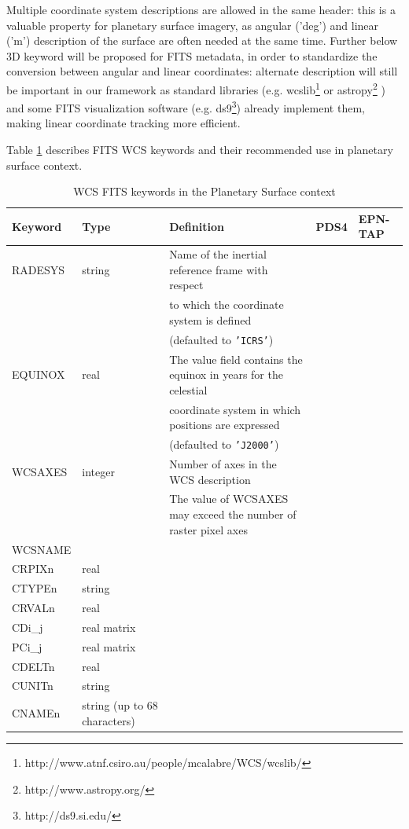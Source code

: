Multiple coordinate system descriptions are allowed in the same header: this is a valuable
property for planetary surface imagery, as angular ('deg') and linear ('m') description of
the surface are often needed at the same time.
Further below 3D keyword will be proposed for FITS metadata, in order to standardize
the conversion between angular and linear coordinates: alternate description will still
be important in our framework as standard libraries (e.g.
wcslib\footnote{http://www.atnf.csiro.au/people/mcalabre/WCS/wcslib/} or
astropy\footnote{http://www.astropy.org/} \citet{astropy}) and some FITS visualization
software (e.g. ds9\footnote{http://ds9.si.edu/}) already implement them, making linear
coordinate tracking more efficient.  

Table \ref{table:wcskeys} describes FITS WCS keywords and their recommended use in
planetary surface context.

\begin{table}
\label{table:wcskeys}
\caption{WCS FITS keywords in the Planetary Surface context}
\centering
\begin{tabular}{l l l l l}
\hline
Keyword & Type & Definition & PDS4 & EPN-TAP \\
\hline
RADESYS	& string & Name of the inertial reference frame with respect & & \\
& & to which the coordinate system is defined & & \\
& & (defaulted to \texttt{'ICRS'}) & & \\
EQUINOX & real & The value field contains the equinox in years for the celestial & & \\
& & coordinate system in which positions are expressed & & \\
& & (defaulted to \texttt{'J2000'}) & & \\
WCSAXES & integer & Number of axes in the WCS description & & \\
& & The value of WCSAXES may exceed the number of raster pixel axes & & \\
WCSNAME & & & & \\
CRPIXn & real & & \\
CTYPEn & string & & \\
CRVALn & real & & \\
CDi\_j & real matrix & & \\
PCi\_j & real matrix & & \\
CDELTn & real & & \\
CUNITn & string & & \\
CNAMEn & string (up to 68 characters) & & \\
\hline
\end{tabular}
\end{table}


